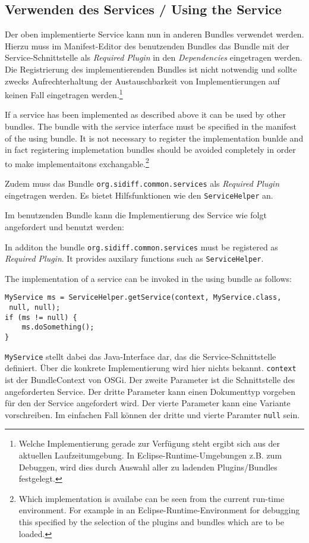 \documentclass[10pt,a4paper]{scrartcl}
\providecommand{\deng}[2]{#1 / {\sffamily #2}}
\providecommand{\deutsch}[1]{#1}
\providecommand{\englisch}[1]{{\sffamily #1}}
\begin{document}
\subsection{\deng{Verwenden des Services}{Using the Service}}
\deutsch{Der oben implementierte Service kann nun in anderen Bundles verwendet
werden. Hierzu muss im Manifest-Editor des benutzenden Bundles das Bundle mit
der Service-Schnittstelle als \emph{Required Plugin} in den \emph{Dependencies}
eingetragen werden. Die Registrierung des implementierenden Bundles ist nicht
notwendig und sollte zwecks Aufrechterhaltung der Austauschbarkeit von
Implementierungen auf keinen Fall eingetragen werden.\footnote{Welche
Implementierung gerade zur Verfügung steht ergibt sich aus der aktuellen
Laufzeitumgebung. In Eclipse-Runtime-Umgebungen z.B. zum Debuggen, wird dies
durch Auswahl aller zu ladenden Plugins/Bundles festgelegt.}}

\englisch{If a service has been implemented as described above it can be used by
other bundles. The bundle with the service interface must be specified in the
manifest of the using bundle. It is not necessary to register the implementation
bunlde and in fact registering implemetation bundles should be avoided
completely in order to make implementaitons exchangable.\footnote{Which
implementation is availabe can be seen from the current run-time environment.
For example in an Eclipse-Runtime-Environment for debugging this specified by
the selection of the plugins and bundles which are to be loaded.}}

\deutsch{Zudem muss das Bundle \texttt{org.sidiff.common.services} als
\emph{Required Plugin} eingetragen werden. Es bietet Hilfsfunktionen wie den
\texttt{ServiceHelper} an.

Im benutzenden Bundle kann die Implementierung des Service wie folgt angefordert
und benutzt werden:}

\englisch{In additon the bundle \texttt{org.sidiff.common.services} must be
registered as \emph{Required Plugin}. It provides auxilary functions such as
\texttt{ServiceHelper}.

The implementation of a service can be invoked in the using bundle as follows:}

\begin{lstlisting}
MyService ms = ServiceHelper.getService(context, MyService.class,
 null, null);
if (ms != null) {
	ms.doSomething();
}
\end{lstlisting}

\deutsch{\texttt{MyService} stellt dabei das Java-Interface dar, das die
Service-Schnittstelle definiert. Über die konkrete Implementierung wird hier
nichts bekannt. \texttt{context} ist der BundleContext von OSGi. Der zweite
Parameter ist die Schnittstelle des angeforderten Service. Der dritte Parameter
kann einen Dokumenttyp vorgeben für den der Service angefordert wird. Der vierte
Parameter kann eine Variante vorschreiben. Im einfachen Fall können der dritte
und vierte Paramter \texttt{null} sein.}
\end{document}
